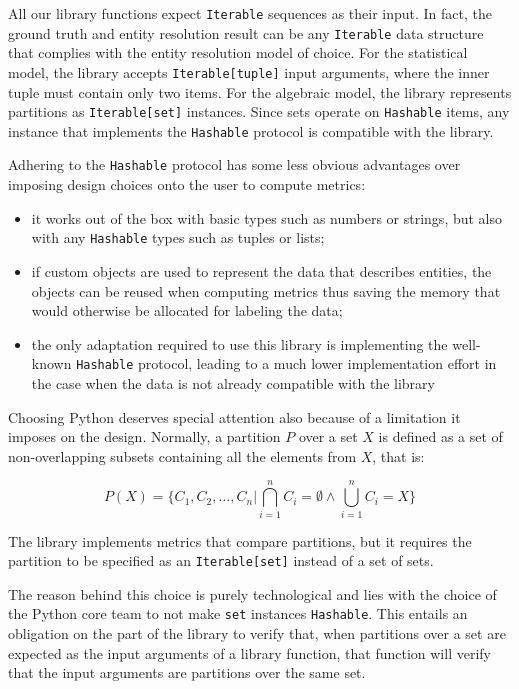 \documentclass[11pt]{article}
\begin{document}
    All our library functions expect \texttt{Iterable} sequences as their input.
    In fact, the ground truth and entity resolution result can be any
    \texttt{Iterable} data structure that complies with the entity resolution
    model of choice.
    For the statistical model, the library accepts \texttt{Iterable[tuple]}
    input arguments, where the inner tuple must contain only two items.
    For the algebraic model, the library represents partitions as
    \texttt{Iterable[set]} instances.
    Since sets operate on \texttt{Hashable} items, any instance that implements
    the \texttt{Hashable} protocol is compatible with the library.
    
    Adhering to the \texttt{Hashable} protocol has some less obvious advantages
    over imposing design choices onto the user to compute metrics:
    \begin{itemize}
        \item it works out of the box with basic types such as numbers or
        strings, but also with any \texttt{Hashable} types such as tuples or
        lists;
        \item if custom objects are used to represent the data that describes
        entities, the objects can be reused when computing metrics thus saving
        the memory that would otherwise be allocated for labeling the data;
        \item the only adaptation required to use this library is implementing
        the well-known \texttt{Hashable} protocol, leading to a much lower
        implementation effort in the case when the data is not already
        compatible with the library\@
    \end{itemize}

    Choosing Python deserves special attention also because of a limitation it
    imposes on the design.
    Normally, a partition $P$ over a set $X$ is defined as a set of
    non-overlapping subsets containing all the elements from $X$, that is:

    \[
        P(X) = \{ C_1, C_2, \ldots, C_n | \bigcap\limits^n_{i=1}C_i=\emptyset \land \bigcup\limits^n_{i=1}C_i=X \}
    \]

    The library implements metrics that compare partitions, but it requires the
    partition to be specified as an \texttt{Iterable[set]} instead of a set of
    sets.

    The reason behind this choice is purely technological and lies with the
    choice of the Python core team to not make \texttt{set} instances
    \texttt{Hashable}.
    This entails an obligation on the part of the library to verify that, when
    partitions over a set are expected as the input arguments of a library
    function, that function will verify that the input arguments are partitions
    over the same set.
\end{document}

